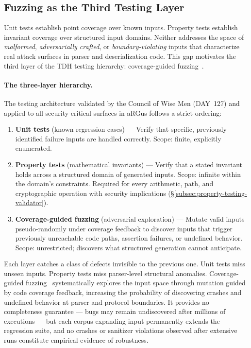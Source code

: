 \documentclass[11pt,a4paper]{article}
\begin{document}
    \subsection{Fuzzing as the Third Testing Layer}
    \label{subsec:fuzzing-third-layer}

    Unit tests establish point coverage over known inputs. Property tests establish
    invariant coverage over structured input domains. Neither addresses the space of
    \emph{malformed}, \emph{adversarially crafted}, or \emph{boundary-violating}
    inputs that characterize real attack surfaces in parser and deserialization code.
    This gap motivates the third layer of the TDH testing hierarchy: coverage-guided
    fuzzing~\cite{libfuzzer2016}.

    \paragraph{The three-layer hierarchy.}
    The testing architecture validated by the Council of Wise Men (DAY~127) and
    applied to all security-critical surfaces in aRGus follows a strict ordering:

    \begin{enumerate}
        \item \textbf{Unit tests} (known regression cases) ---
        Verify that specific, previously-identified failure inputs are handled
        correctly. Scope: finite, explicitly enumerated.

        \item \textbf{Property tests} (mathematical invariants) ---
        Verify that a stated invariant holds across a structured domain of
        generated inputs. Scope: infinite within the domain's constraints.
        Required for every arithmetic, path, and cryptographic operation with
        security implications (\S\ref{subsec:property-testing-validator}).

        \item \textbf{Coverage-guided fuzzing} (adversarial exploration) ---
        Mutate valid inputs pseudo-randomly under coverage feedback to discover
        inputs that trigger previously unreachable code paths, assertion failures,
        or undefined behavior. Scope: unrestricted; discovers what structured
        generation cannot anticipate.
    \end{enumerate}

    Each layer catches a class of defects invisible to the previous one.
    Unit tests miss unseen inputs. Property tests miss parser-level structural
    anomalies. Coverage-guided fuzzing~\cite{libfuzzer2016} systematically
    explores the input space through mutation guided by code coverage feedback,
    increasing the probability of discovering crashes and undefined behavior at
    parser and protocol boundaries. It provides no completeness guarantee ---
    bugs may remain undiscovered after millions of executions --- but each
    corpus-expanding input permanently extends the regression suite, and no
    crashes or sanitizer violations observed after extensive runs constitute
    empirical evidence of robustness.
\end{document}
